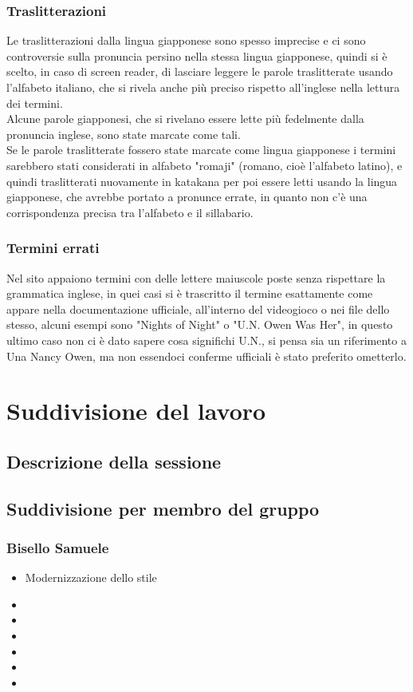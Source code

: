 \documentclass[openany, a4paper, 12pt]{report}
\begin{document}
			\subsection{Traslitterazioni}
				Le traslitterazioni dalla lingua giapponese sono spesso imprecise e ci sono controversie sulla pronuncia persino nella stessa lingua giapponese, quindi si è scelto, in caso di screen reader, di lasciare leggere le parole traslitterate usando l'alfabeto italiano, che si rivela anche più preciso rispetto all'inglese nella lettura dei termini.\\
				Alcune parole giapponesi, che si rivelano essere lette più fedelmente dalla pronuncia inglese, sono state marcate come tali.\\
				Se le parole traslitterate fossero state marcate come lingua giapponese i termini sarebbero stati considerati in alfabeto "romaji" (romano, cioè l'alfabeto latino), e quindi traslitterati nuovamente in katakana per poi essere letti usando la lingua giapponese, che avrebbe portato a pronunce errate, in quanto non c'è una corrispondenza precisa tra l'alfabeto e il sillabario.
			\subsection{Termini errati}
				Nel sito appaiono termini con delle lettere maiuscole poste senza rispettare la grammatica inglese, in quei casi si è trascritto il termine esattamente come appare nella documentazione ufficiale, all'interno del videogioco o nei file dello stesso, alcuni esempi sono "Nights of Night" o "U.N. Owen Was Her", in questo ultimo caso non ci è dato sapere cosa significhi U.N., si pensa sia un riferimento a Una Nancy Owen, ma non essendoci conferme ufficiali è stato preferito ometterlo.\\
			
	\chapter{Suddivisione del lavoro}
	\section{Descrizione della sessione}
	\section{Suddivisione per membro del gruppo}
	\subsection{Bisello Samuele}
	\begin{itemize}
		\item Modernizzazione dello stile
		\item 
		\item 
		\item 
		\item 
		\item 
		\item 
	\end{itemize}
\end{document}
